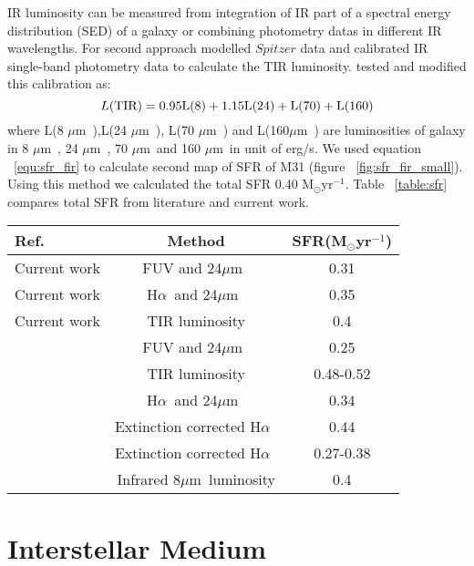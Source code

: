 \documentclass[useAMS,usenatbib]{mn2e}
\newcommand \halpha    {H$\alpha $\ }
\newcommand \um    {$\mu$m\ }
\begin{document}
IR luminosity can be measured from integration of IR part of a spectral energy distribution (SED) of a galaxy or combining photometry datas in different IR wavelengths. For second approach \cite{Draine07} modelled $Spitzer$ data and calibrated IR single-band photometry data to calculate the TIR luminosity. \cite{Boquien10} tested and modified this calibration as:
\begin{equation}
 \label{equ: TIR}
L(\rm TIR) = 0.95L(8) + 1.15L(24) + L(70) + L(160)
\end{equation}
where L(8 \um),L(24 \um), L(70 \um) and L(160\um) are luminosities of galaxy in 8 \um, 24 \um, 70 \um and 160 \um in unit of erg/s. We used equation ~\ref{equ:sfr_fir} to calculate second map of SFR of M31 (figure ~\ref{fig:sfr_fir_small}). Using this method we calculated the total SFR 0.40 M$_{\odot}$yr$^{-1}$. Table ~\ref{table:sfr} compares total SFR from literature and current work.

\begin{table*}
\begin{minipage}{100mm}
\caption{Comparison of Total Star Formation Rate of M31}
\label{table:sfr}
\begin{tabular}{@{}lcc}
\hline\hline
Ref.&Method&SFR(M$_{\odot}$yr$^{-1}$) \\
\hline
Current work&FUV and 24\um&0.31\\
Current work&\halpha and 24\um&0.35\\
Current work&TIR luminosity&0.4\\
\cite{Ford13}&FUV and 24\um&0.25\\
\cite{Ford13}&TIR luminosity&0.48-0.52\\
\cite{Azimlu11}& \halpha and 24\um&0.34\\
\cite{Azimlu11}&Extinction corrected \halpha&0.44\\
\cite{Tabatabaei10}&Extinction corrected \halpha&0.27-0.38\\
\cite{Barmby06}&Infrared 8\um luminosity& 0.4\\
\hline
\end{tabular}
\end{minipage}
\end{table*}

\section{Interstellar Medium}
\end{document}
